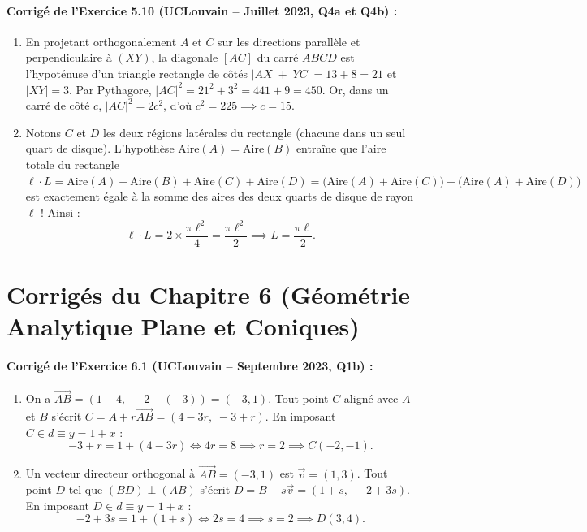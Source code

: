 \paragraph{Corrigé de l'Exercice 5.10 (UCLouvain -- Juillet 2023, Q4a et Q4b) :}
\begin{enumerate}[label=(\alph*)]
    \item En projetant orthogonalement $A$ et $C$ sur les directions parallèle et perpendiculaire à $(XY)$, la diagonale $[AC]$ du carré $ABCD$ est l'hypoténuse d'un triangle rectangle de côtés $|AX| + |YC| = 13 + 8 = 21$ et $|XY| = 3$. Par Pythagore, $|AC|^2 = 21^2 + 3^2 = 441 + 9 = 450$. Or, dans un carré de côté $c$, $|AC|^2 = 2c^2$, d'où $c^2 = 225 \implies \boxed{c = 15}$.
    \item Notons $C$ et $D$ les deux régions latérales du rectangle (chacune dans un seul quart de disque). L'hypothèse $\text{Aire}(A) = \text{Aire}(B)$ entraîne que l'aire totale du rectangle $\ell \cdot L = \text{Aire}(A) + \text{Aire}(B) + \text{Aire}(C) + \text{Aire}(D) = \bigl(\text{Aire}(A) + \text{Aire}(C)\bigr) + \bigl(\text{Aire}(A) + \text{Aire}(D)\bigr)$ est exactement égale à la somme des aires des deux quarts de disque de rayon $\ell$ ! Ainsi :
    \[
        \ell \cdot L = 2 \times \frac{\pi\ell^2}{4} = \frac{\pi\ell^2}{2} \implies \boxed{L = \frac{\pi\ell}{2}}.
    \]
\end{enumerate}

\section{Corrigés du Chapitre 6 (Géométrie Analytique Plane et Coniques)}

\paragraph{Corrigé de l'Exercice 6.1 (UCLouvain -- Septembre 2023, Q1b) :}
\begin{enumerate}[label=(\alph*)]
    \item On a $\overrightarrow{AB} = (1-4,\; -2-(-3)) = (-3, 1)$. Tout point $C$ aligné avec $A$ et $B$ s'écrit $C = A + r\overrightarrow{AB} = (4-3r,\; -3+r)$. En imposant $C \in d \equiv y = 1+x$ :
    \[
        -3 + r = 1 + (4 - 3r) \iff 4r = 8 \implies r = 2 \implies \boxed{C(-2, -1)}.
    \]
    \item Un vecteur directeur orthogonal à $\overrightarrow{AB} = (-3, 1)$ est $\vec{v} = (1, 3)$. Tout point $D$ tel que $(BD) \perp (AB)$ s'écrit $D = B + s\vec{v} = (1+s,\; -2+3s)$. En imposant $D \in d \equiv y = 1+x$ :
    \[
        -2 + 3s = 1 + (1 + s) \iff 2s = 4 \implies s = 2 \implies \boxed{D(3, 4)}.
    \]
\end{enumerate}


